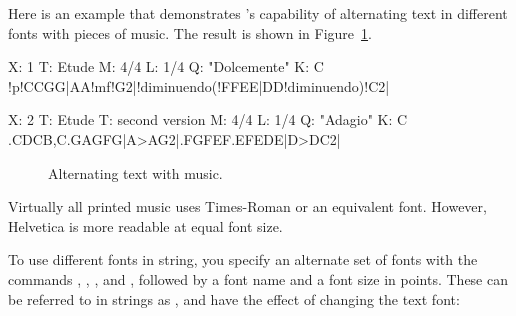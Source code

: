 \documentclass[a4paper,12pt]{book}
\begin{document}
Here is an example that demonstrates \abcm{}'s capability of
alternating text in different fonts with pieces of music. The result
is shown in Figure~\ref{fig:typeset}.

{\small
\begin{abcsource}
%
X: 1
T: Etude
M: 4/4
L: 1/4
Q: "Dolcemente"
K: C
%
!p!CCGG|AA!mf!G2|!diminuendo(!FFEE|DD!diminuendo)!C2|

X: 2
T: Etude
T: second version
M: 4/4
L: 1/4
Q: "Adagio"
K: C
%
.C{DCB,}C.G{AGF}G|A>AG2|.F{GFE}F.E{FED}E|D>DC2|
\end{abcsource}
}

\begin{center}
\begin{figure}[htbp]
\caption{Alternating text with music.}
\label{fig:typeset}
\end{figure}
\end{center}

\begin{note}

  Virtually all printed music uses Times-Roman or an equivalent font.
  However, Helvetica is more readable at equal font size.

\end{note}

To use different fonts in string, you specify an alternate set of
fonts with the commands ,
, , and
, followed by a font name and a font size in
points. These can be referred to in strings as ,
and have the effect of changing the text font:
\end{document}
